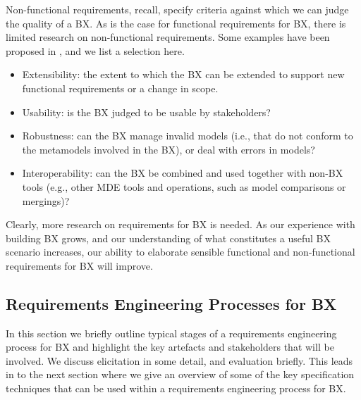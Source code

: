 Non-functional requirements, recall, specify criteria against which we can judge the quality of a BX. As is the case for functional requirements for BX, there is limited research on non-functional requirements. Some examples have been proposed in \cite{NalchigarSC13}, and we list a selection here.

\begin{itemize}
\item Extensibility: the extent to which the BX can be extended to support new functional requirements  or a change in scope.

\item Usability: is the BX judged to be usable by stakeholders?

\item Robustness: can the BX manage invalid models (i.e., that do not conform to the metamodels involved in the BX), or deal with errors in models?

\item Interoperability: can the BX be combined and used together with non-BX tools (e.g., other MDE tools and operations, such as model comparisons or mergings)?
\end{itemize}

Clearly, more research on requirements for BX is needed. As our experience with building BX grows, and our understanding of what constitutes a useful BX scenario increases, our ability to elaborate sensible functional and non-functional requirements for BX will improve.

\subsection{Requirements Engineering Processes for BX}
In this section we briefly outline typical stages of a requirements engineering process for BX and highlight the key artefacts and stakeholders that will be involved. We discuss elicitation in some detail, and evaluation briefly. This leads in to the next section where we give an overview of some of the key specification techniques that can be used within a requirements engineering process for BX.

